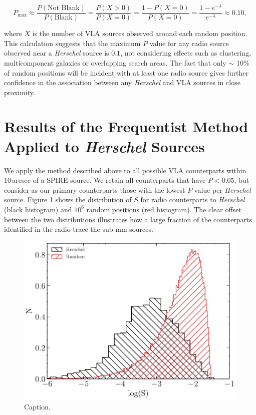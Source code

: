 \begin{equation}
    P_{\textrm{max}} \approx \frac{P(\textrm{Not Blank})}{P(\textrm{Blank})} = \frac{P(X > 0)}{P(X = 0)} = \frac{1 - P(X = 0)}{P(X = 0)} = \frac{1 - e^{-\lambda}}{e^{-\lambda}} \approx 0.10,
\end{equation}

\noindent where $X$ is the number of VLA sources observed around each random position. This calculation suggests that the maximum $P$ value for any radio source observed near a \textit{Herschel} source is $0.1$, not considering effects such as clustering, multicomponent galaxies or overlapping search areas. The fact that only $\sim$ 10\% of random positions will be incident with at least one radio source gives further confidence in the association between any \textit{Herschel} and VLA sources in close proximity.

\section{Results of the Frequentist Method Applied to \textit{Herschel} Sources}

We apply the method described above to all possible VLA counterparts within 10\,arcsec of a SPIRE source. We retain all counterparts that have $P < 0.05$, but consider as our primary counterparts those with the lowest $P$ value per \textit{Herschel} source. Figure \ref{fig:ds_distributions} shows the distribution of $S$ for radio counterparts to \textit{Herschel} (black histogram) and $10^6$ random positions (red histogram). The clear offset between the two distributions illustrates how a large fraction of the counterparts identified in the radio trace the sub-mm sources.

\begin{figure}
	\centering
	\includegraphics[width=0.75\columnwidth]{Figures/ds_distributions.pdf}
	\caption{{\color{red} Caption.}}
	\label{fig:ds_distributions}
\end{figure}

